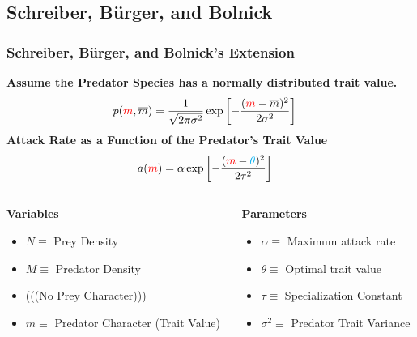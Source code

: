\documentclass[10pt]{beamer}
\begin{document}
\subsection{Schreiber, B\"urger, and Bolnick}
\begin{frame}
	\frametitle{Schreiber, B\"urger, and Bolnick's Extension}
	{\bf Assume the {\color{red}Predator Species} has a normally distributed trait value.}
	\begin{align*}
		p({\color{red}m}, \overline{m}) &= \frac{1}{\sqrt{2\pi\sigma^2}}\exp\left[{-\frac{({\color{red}m} - \overline{m})^2}{2\sigma^2}}\right]
	\end{align*}
	{\bf Attack Rate as a Function of the {\color{red}Predator's Trait Value}}
	\begin{align*}
		a({\color{red}m}) &= \alpha \exp\left[-\frac{({\color{red}m} - {\color{cyan}\theta})^2}{2\tau^2}\right]
	\end{align*}
	\begin{columns}
		\begin{column}{0.4\textwidth}
			{\bf Variables}
			\begin{itemize}
				\item $N \equiv $ Prey Density
				\item $M \equiv $ Predator Density
				\item {\color{blue} (((No Prey Character)))}
				\item {\color{red}$m \equiv $ Predator Character (Trait Value)}
			\end{itemize}
		\end{column}
		\begin{column}{0.55\textwidth}
			{\bf Parameters}
			\begin{itemize}
				\item $\alpha \equiv $ Maximum attack rate
				\item {\color{cyan}$\theta \equiv $ Optimal trait value \uncover<2->{\ \ \ \ \ $\longleftarrow$ {\it No variation!}}}
				\item $\tau \equiv $ Specialization Constant
				\item $\sigma^2 \equiv $ Predator Trait Variance
			\end{itemize}
		\end{column}
	\end{columns}
\end{frame}
\end{document}
